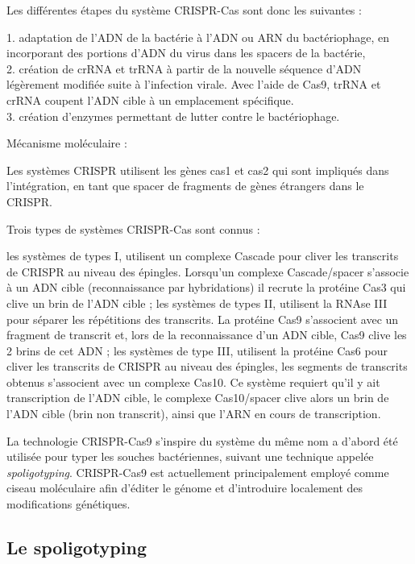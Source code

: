 \documentclass[twoside,a4paper,11pt,frenchb,openany]{report}
\begin{document}
Les différentes étapes du système CRISPR-Cas sont donc les suivantes :

1. adaptation de l'ADN de la bactérie à l'ADN ou ARN du bactériophage, en incorporant des portions d'ADN du virus dans les spacers de la bactérie,\\
2. création de crRNA et trRNA à partir de la nouvelle séquence d'ADN légèrement modifiée suite à l'infection virale. Avec l'aide de Cas9, trRNA et crRNA coupent l'ADN cible à un emplacement spécifique.\\
3. création d'enzymes permettant de lutter contre le bactériophage.

Mécanisme moléculaire :

Les systèmes CRISPR utilisent les gènes cas1 et cas2 qui sont impliqués dans l'intégration, en tant que spacer de fragments de gènes étrangers dans le CRISPR.

Trois types de systèmes CRISPR-Cas sont connus :

les systèmes de types I, utilisent un complexe Cascade pour cliver les transcrits de CRISPR au niveau des épingles. Lorsqu'un complexe Cascade/spacer s'associe à un ADN cible (reconnaissance par hybridations) il recrute la protéine Cas3 qui clive un brin de l'ADN cible ;
les systèmes de types II, utilisent la RNAse III pour séparer les répétitions des transcrits. La protéine Cas9 s'associent avec un fragment de transcrit et, lors de la reconnaissance d'un ADN cible, Cas9 clive les 2 brins de cet ADN ;
les systèmes de type III, utilisent la protéine Cas6 pour cliver les transcrits de CRISPR au niveau des épingles, les segments de transcrits obtenus s'associent avec un complexe Cas10. Ce système requiert qu'il y ait transcription de l'ADN cible, le complexe Cas10/spacer clive alors un brin de l'ADN cible (brin non transcrit), ainsi que l'ARN en cours de transcription.


La technologie CRISPR-Cas9 s'inspire du système du même nom a d'abord été utilisée pour typer les souches bactériennes, suivant une technique appelée \textit{spoligotyping}. CRISPR-Cas9 est actuellement principalement employé comme ciseau moléculaire afin d'éditer le génome et d'introduire localement des modifications génétiques.


\subsection{Le spoligotyping}
\end{document}
